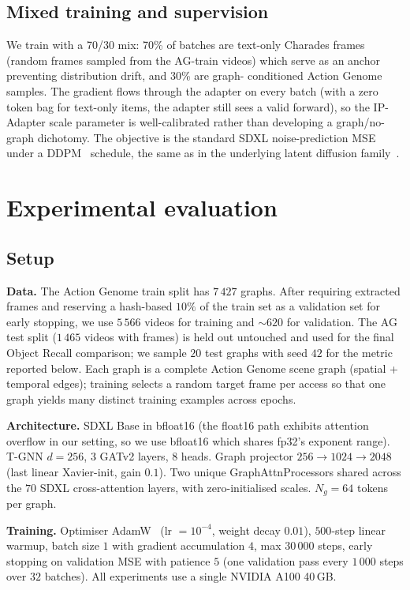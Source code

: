 \documentclass[11pt]{article}
\begin{document}
\subsection{Mixed training and supervision}
We train with a 70/30 mix: 70\% of batches are text-only Charades
frames (random frames sampled from the AG-train videos) which serve as
an anchor preventing distribution drift, and 30\% are graph-
conditioned Action Genome samples. The gradient flows through the
adapter on every batch (with a zero token bag for text-only items, the
adapter still sees a valid forward), so the IP-Adapter scale parameter
is well-calibrated rather than developing a graph/no-graph dichotomy.
The objective is the standard SDXL noise-prediction MSE under a
DDPM~\cite{ho2020ddpm} schedule, the same as in the underlying latent
diffusion family~\cite{rombach2022sd}.

\section{Experimental evaluation}
\label{sec:exp}
\subsection{Setup}
\textbf{Data.} The Action Genome train split has $7\,427$ graphs.
After requiring extracted frames and reserving a hash-based $10\%$ of
the train set as a validation set for early stopping, we use $5\,566$
videos for training and $\sim 620$ for validation. The AG test split
($1\,465$ videos with frames) is held out untouched and used for the
final Object Recall comparison; we sample $20$ test graphs with seed
$42$ for the metric reported below. Each graph is a complete Action
Genome scene graph (spatial + temporal edges); training selects a
random target frame per access so that one graph yields many distinct
training examples across epochs.

\textbf{Architecture.} SDXL Base in bfloat16 (the float16 path
exhibits attention overflow in our setting, so we use bfloat16 which
shares fp32's exponent range). T-GNN $d=256$, $3$ GATv2 layers, $8$
heads. Graph projector $256\to 1024\to 2048$ (last linear Xavier-init,
gain $0.1$). Two unique GraphAttnProcessors shared across the $70$
SDXL cross-attention layers, with zero-initialised scales.
$N_g=64$ tokens per graph.

\textbf{Training.} Optimiser AdamW~\cite{loshchilov2019adamw}
(lr $=10^{-4}$, weight decay $0.01$), $500$-step linear warmup, batch
size $1$ with gradient accumulation $4$, max $30\,000$ steps, early
stopping on validation MSE with patience $5$ (one validation pass
every $1\,000$ steps over $32$ batches).  All experiments use a single
NVIDIA A100 40\,GB.
\end{document}
